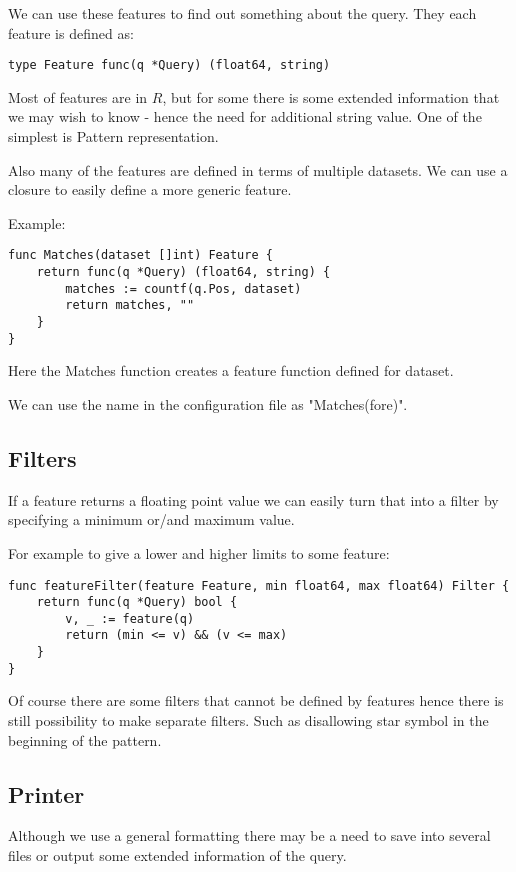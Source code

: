 We can use these features to find out something about the query.
They each feature is defined as:

\begin{verbatim}
type Feature func(q *Query) (float64, string)
\end{verbatim}

Most of features are in $R$, but for some there
is some extended information that we may wish to know - hence
the need for additional string value. One of the simplest
is Pattern representation.

Also many of the features are defined in terms of multiple datasets.
We can use a closure to easily define a more generic feature.

Example:

\begin{verbatim}
func Matches(dataset []int) Feature {
	return func(q *Query) (float64, string) {
		matches := countf(q.Pos, dataset)
		return matches, ""
	}
}
\end{verbatim}

Here the Matches function creates a feature function defined
for dataset.

We can use the name in the configuration file as "Matches(fore)".

\subsection{Filters}

If a feature returns a floating point value we can easily turn that
into a filter by specifying a minimum or/and maximum value.

For example to give a lower and higher limits to some feature:

\begin{verbatim}
func featureFilter(feature Feature, min float64, max float64) Filter {
	return func(q *Query) bool {
		v, _ := feature(q)
		return (min <= v) && (v <= max)
	}
}
\end{verbatim}

Of course there are some filters that cannot be defined by features hence
there is still possibility to make separate filters. Such as disallowing
star symbol in the beginning of the pattern.

\subsection{Printer}

Although we use a general formatting there may be a need to save into
several files or output some extended information of the query.

